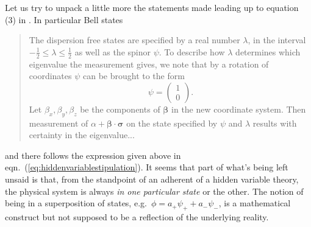 \documentclass[12pt]{article}
\begin{document}
Let us try to unpack a little more the statements made leading up to equation (3) in \cite[p.448]{Bell1966}. In particular Bell states
\begin{quotation}
  \begin{small}
    The dispersion free states are specified by a real number $\lambda$, in the interval $-\frac{1}{2} \le \lambda \le \frac{1}{2}$ as well as the spinor $\psi$. To describe how $\lambda$ determines which eigenvalue the measurement gives, we note that by a rotation of coordinates $\psi$ can be brought to the form
    \begin{displaymath}
      \psi =
      \begin{pmatrix}
        1 \\
        0
      \end{pmatrix}.
    \end{displaymath}
    Let $\beta_x, \beta_y, \beta_z$ be the components of $\bm{\beta}$ in the new coordinate system. Then measurement of $\alpha + \bm{\beta} \cdot \bm{\sigma}$ on the state specified by $\psi$ and $\lambda$ results with certainty in the eigenvalue...
  \end{small}
\end{quotation}
and there follows the expression given above in eqn.~(\ref{eq:hiddenvariablestipulation}). It seems that part of what's being left unsaid is that, from the standpoint of an adherent of a hidden variable theory, the physical system is always \emph{in one particular state} or the other. The notion of being in a superposition of states, e.g.\ $\phi = a_{+} \psi_{+} + a_{-} \psi_{-}$, is a mathematical construct but not supposed to be a reflection of the underlying reality.
\end{document}
